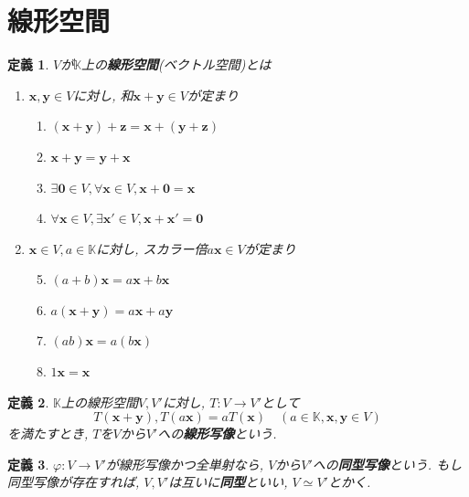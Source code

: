 \documentclass[a4j,dvipdfmx]{jsarticle}
\newcommand{\K}{\mathbb{K}}
\renewcommand{\labelenumi}{(\arabic{enumi})}
\theoremstyle{mystyle}
\newtheorem*{definition}{定義}
\begin{document}
\section{線形空間}
    \begin{definition}
        $V$が$\K$上の\textbf{線形空間}(ベクトル空間)とは
        \begin{enumerate}\renewcommand{\labelenumi}{(\Roman{enumi})}
            \item $\bm{x},\bm{y}\in V$に対し, 和$\bm{x}+\bm{y}\in V$が定まり
            \begin{enumerate}\renewcommand{\labelenumii}{(\arabic{enumii})}
                \item $(\bm{x}+\bm{y})+\bm{z}=\bm{x}+(\bm{y}+\bm{z})$
                \item $\bm{x}+\bm{y}=\bm{y}+\bm{x}$
                \item $\exists\bm{0}\in V,\forall \bm{x}\in V, \bm{x}+\bm{0}=\bm{x}$
                \item $\forall\bm{x}\in V,\exists\bm{x}'\in V, \bm{x}+\bm{x}'=\bm{0}$
            \end{enumerate}
            \item $\bm{x}\in V,a\in\K$に対し, スカラー倍$a\bm{x}\in V$が定まり
            \begin{enumerate}\setcounter{enumii}{4}\renewcommand{\labelenumii}{(\arabic{enumii})}
                \item $(a+b)\bm{x}=a\bm{x}+b\bm{x}$
                \item $a(\bm{x}+\bm{y})=a\bm{x}+a\bm{y}$
                \item $(ab)\bm{x}=a(b\bm{x})$
                \item $1\bm{x}=\bm{x}$
            \end{enumerate}
        \end{enumerate}
    \end{definition}
    \begin{definition}
        $\K$上の線形空間$V,V'$に対し, $T:V\to V'$として
        \begin{equation*}
            T(\bm{x}+\bm{y}), T(a\bm{x})=aT(\bm{x})\quad (a\in\K,\bm{x},\bm{y}\in V)
        \end{equation*}
        を満たすとき, $T$を$V$から$V'$への\textbf{線形写像}という.
    \end{definition}
    \begin{definition}
        $\varphi:V\to V'$が線形写像かつ全単射なら, $V$から$V'$への\textbf{同型写像}という. もし同型写像が存在すれば, $V,V'$は互いに\textbf{同型}といい, $V\simeq V'$とかく.
    \end{definition}
\end{document}
